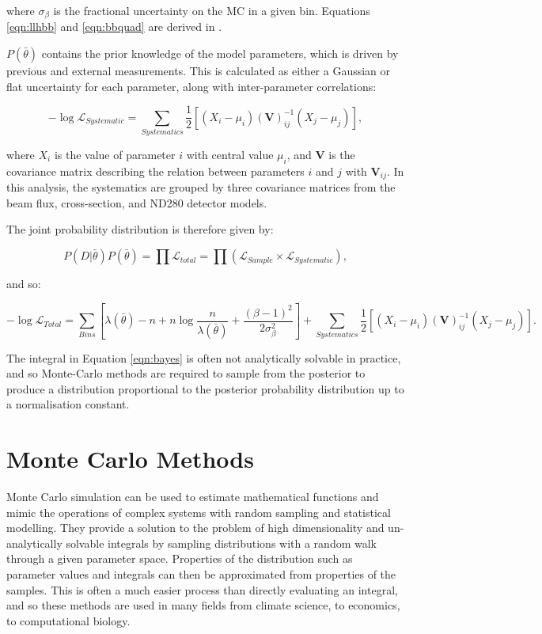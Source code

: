 where $\sigma_{\beta}$ is the fractional uncertainty on the MC in a given bin. Equations \ref{eqn:llhbb} and \ref{eqn:bbquad} are derived in \cite{beestonbarlow}.

$P(\bar{\theta})$ contains the prior knowledge of the model parameters, which is driven by previous and external measurements. This is calculated as either a Gaussian or flat uncertainty for each parameter, along with inter-parameter correlations:

\begin{equation}
-\log\mathcal{L}_{Systematic} = \sum_{Systematics} \frac{1}{2} [(X_i - \mu_i) (\textbf{V})_{ij}^{-1} (X_j - \mu_j)],
\end{equation}\label{eqn:systllh}

where $X_i$ is the value of parameter $i$ with central value $\mu_i$, and $\textbf{V}$ is the covariance matrix describing the relation between parameters $i$ and $j$ with $\textbf{V}_{ij}$. In this analysis, the systematics are grouped by three covariance matrices from the beam flux, cross-section, and ND280 detector models.

The joint probability distribution is therefore given by:

\begin{equation}
P(D|\bar{\theta}) P(\bar{\theta}) = \prod \mathcal{L}_{total} = \prod (\mathcal{L}_{Sample} \times \mathcal{L}_{Systematic}),
\end{equation}

 and so:

\begin{equation}
-\log\mathcal{L}_{Total} = \sum_{Bins}[\lambda(\bar{\theta}) - n + n \log \frac{n}{\lambda(\bar{\theta})}+ \frac{(\beta -1)^2}{2\sigma^{2}_\beta}] + \sum_{Systematics} \frac{1}{2} [(X_i - \mu_i) (\textbf{V})_{ij}^{-1} (X_j - \mu_j)].
\end{equation}

The integral in Equation \ref{eqn:bayes} is often not analytically solvable in practice, and so Monte-Carlo methods are required to sample from the posterior to produce a distribution proportional to the posterior probability distribution up to a normalisation constant. 

\section{Monte Carlo Methods}\label{sec:montecarlo}
Monte Carlo simulation can be used to estimate mathematical functions and mimic the operations of complex systems with random sampling and statistical modelling. They provide a solution to the problem of high dimensionality and un-analytically solvable integrals by sampling distributions with a random walk through a given parameter space. Properties of the distribution such as parameter values and integrals can then be approximated from properties of the samples. This is often a much easier process than directly evaluating an integral, and so these methods are used in many fields from climate science, to economics, to computational biology.

